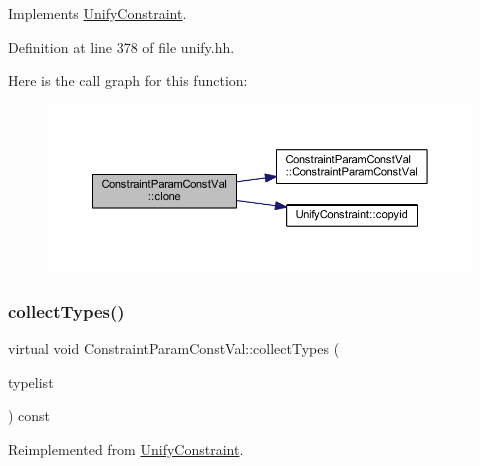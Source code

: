 Implements \mbox{\hyperlink{class_unify_constraint_a4f068343932637d355644bb21559aa12}{Unify\+Constraint}}.



Definition at line 378 of file unify.\+hh.

Here is the call graph for this function\+:
\nopagebreak
\begin{figure}[H]
\begin{center}
\leavevmode
\includegraphics[width=350pt]{class_constraint_param_const_val_a74c4f987687e1919f47c1b1d30b303da_cgraph}
\end{center}
\end{figure}
\mbox{\label{class_constraint_param_const_val_a7e43f8b626eae12d4a2c3df1d9b63483}} 
\subsubsection{\texorpdfstring{collectTypes()}{collectTypes()}}
{\footnotesize\ttfamily virtual void Constraint\+Param\+Const\+Val\+::collect\+Types (\begin{DoxyParamCaption}\item[{vector$<$ \mbox{\hyperlink{class_unify_datatype}{Unify\+Datatype}} $>$ \&}]{typelist }\end{DoxyParamCaption}) const\hspace{0.3cm}{\ttfamily [virtual]}}



Reimplemented from \mbox{\hyperlink{class_unify_constraint_acb83b6bea3b21e13054e72ac9cfaba0f}{Unify\+Constraint}}.

\mbox{\label{class_constraint_param_const_val_a77b6c5d0d0182a1c6b31e823f954266c}} 

